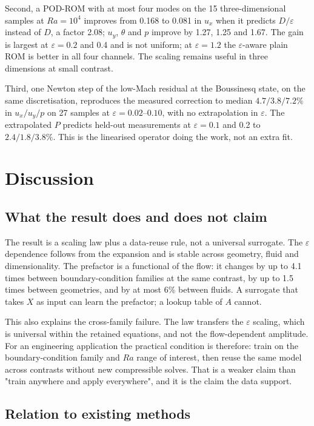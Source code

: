 \documentclass[preprint,11pt,a4paper,times,doubleblind]{elsarticle}
\begin{document}
Second, a POD-ROM with at most four modes on the 15 three-dimensional samples at $Ra=10^4$
improves from 0.168 to 0.081 in $u_x$ when it predicts $D/\varepsilon$ instead of $D$, a factor
2.08; $u_y$, $\theta$ and $p$ improve by 1.27, 1.25 and 1.67. The gain is largest at
$\varepsilon=0.2$ and 0.4 and is not uniform; at $\varepsilon=1.2$ the $\varepsilon$-aware plain
ROM is better in all four channels. The scaling remains useful in three dimensions at
small contrast.

Third, one Newton step of the low-Mach residual at the Boussinesq state, on the same
discretisation, reproduces the measured correction to median $4.7/3.8/7.2\%$ in
$u_x/u_y/p$ on 27 samples at $\varepsilon=0.02$--$0.10$, with no extrapolation in
$\varepsilon$. The extrapolated $P$ predicts held-out measurements at $\varepsilon=0.1$ and
0.2 to $2.4/1.8/3.8\%$. This is the linearised operator doing the work, not an extra fit.

\section{Discussion}
\label{sec:discussion}

\subsection{What the result does and does not claim}

The result is a scaling law plus a data-reuse rule, not a universal surrogate. The
$\varepsilon$ dependence follows from the expansion and is stable across geometry, fluid and
dimensionality. The prefactor is a functional of the flow: it changes by up to 4.1 times between
boundary-condition families at the same contrast, by up to 1.5 times between geometries, and by
at most 6\% between fluids. A surrogate that takes $X$ as input can learn the prefactor; a
lookup table of $A$ cannot.

This also explains the cross-family failure. The law transfers the $\varepsilon$ scaling,
which is universal within the retained equations, and not the flow-dependent amplitude. For an
engineering application the practical condition is therefore: train on the boundary-condition
family and $Ra$ range of interest, then reuse the same model across contrasts without new
compressible solves. That is a weaker claim than "train anywhere and apply everywhere", and it
is the claim the data support.

\subsection{Relation to existing methods}
\end{document}
